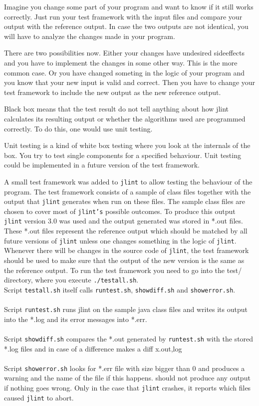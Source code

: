 \documentclass[11pt,twoside,a4paper,draft]{article}
\begin{document}
Imagine you change some part of your program and want to know if it 
still works correctly. Just run your test framework with the input files
and compare your output with the reference output. In case the two
outputs are not identical, you will have to analyze the changes 
made in your program.

There are two possibilities now. Either your changes have undesired
sideeffects and you have to implement the changes in some other 
way. This is the more common case. Or you have changed someting
in the logic of your program and you know that your new input is
valid and correct. Then you have to change your test framework
to include the new output as the new reference output.


Black box means that the test result do not tell anything about how
jlint calculates its resulting output or whether the algorithms used
are programmed correctly. To do this, one would use unit testing.

Unit testing is a kind of white box testing where you look at the internals
of the box. You try to test single components for a
specified behaviour. Unit testing could be implemented in a future version
of the test framework.


A small test framework was added to \texttt{jlint} to allow testing the
behaviour of the program. The test framework consists of a sample of class
files together with the output that \texttt{jlint} generates when run on these
files. The sample class files are chosen to cover most of \texttt{jlint's}
possible outcomes. To produce this output \texttt{jlint} version 3.0 was used
and the output generated was stored in *.out files. These *.out files 
represent the reference output which should be matched by all future versions
of \texttt{jlint} unless one changes something in the logic of \texttt{jlint}.
Whenever there will be changes in the source code of \texttt{jlint}, the test
framework should be used to make sure that the output of the new version is 
the same as the reference output. To run the test framework you need to go
into the test/ directory, where you execute \texttt{./testall.sh}.
\\Script \texttt{testall.sh} itself calls \texttt{runtest.sh}, 
\texttt{show\-diff.sh} and \texttt{showerror.sh}.
\\\\Script \texttt{runtest.sh}
runs jlint on the sample java class files and writes its output into the 
*.log and its error messages into *.err.
\\\\Script \texttt{showdiff.sh}
compares the *.out generated by \texttt{runtest.sh} with the stored *.log
files and in case of a difference makes a diff x.{out,log}
\\\\Script \texttt{showerror.sh}
looks for *.err file with size bigger than 0 and produces a warning and the 
name of the file if this happens.
should not produce any output if nothing goes wrong. Only in the case that 
\texttt{jlint} crashes, it reports which files caused \texttt{jlint} to abort.
\end{document}
